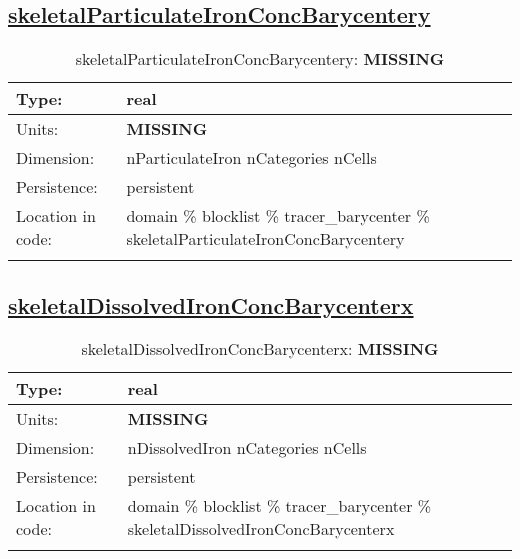 \subsection[skeletalParticulateIronConcBarycentery]{\hyperref[sec:var_tab_tracer_barycenter]{skeletalParticulateIronConcBarycentery}}
\label{subsec:var_sec_tracer_barycenter_skeletalParticulateIronConcBarycentery}
\begin{center}
\begin{longtable}{| p{2.0in} | p{4.0in} |}
        \hline 
        Type: & real \\
        \hline 
        Units: & {\bf \color{red} MISSING} \\
        \hline 
        Dimension: & nParticulateIron nCategories nCells \\
        \hline 
        Persistence: & persistent \\
        \hline 
         Location in code: & domain \% blocklist \% tracer\_barycenter \% skeletalParticulateIronConcBarycentery \\
         \hline 
    \caption{skeletalParticulateIronConcBarycentery: {\bf \color{red} MISSING}}
\end{longtable}
\end{center}
\subsection[skeletalDissolvedIronConcBarycenterx]{\hyperref[sec:var_tab_tracer_barycenter]{skeletalDissolvedIronConcBarycenterx}}
\label{subsec:var_sec_tracer_barycenter_skeletalDissolvedIronConcBarycenterx}
\begin{center}
\begin{longtable}{| p{2.0in} | p{4.0in} |}
        \hline 
        Type: & real \\
        \hline 
        Units: & {\bf \color{red} MISSING} \\
        \hline 
        Dimension: & nDissolvedIron nCategories nCells \\
        \hline 
        Persistence: & persistent \\
        \hline 
         Location in code: & domain \% blocklist \% tracer\_barycenter \% skeletalDissolvedIronConcBarycenterx \\
         \hline 
    \caption{skeletalDissolvedIronConcBarycenterx: {\bf \color{red} MISSING}}
\end{longtable}
\end{center}
